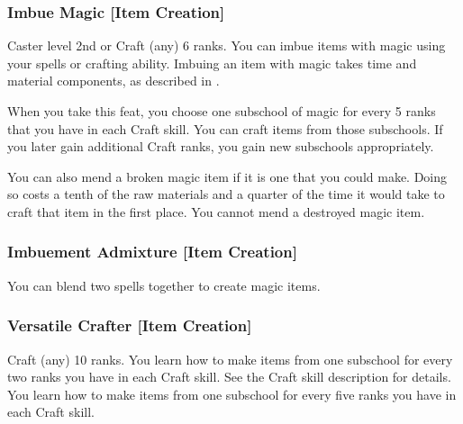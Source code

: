 \subsubsection{Imbue Magic [Item Creation]}
 Caster level 2nd or Craft (any) 6 ranks.
 You can imbue items with magic using your spells or crafting ability. Imbuing an item with magic takes time and material components, as described in .

When you take this feat, you choose one subschool of magic for every 5 ranks that you have in each Craft skill. You can craft items from those subschools. If you later gain additional Craft ranks, you gain new subschools appropriately.

You can also mend a broken magic item if it is one that you could make. Doing so costs a tenth of the raw materials and a quarter of the time it would take to craft that item in the first place. You cannot mend a destroyed magic item.

\subsubsection{Imbuement Admixture [Item Creation]}
 You can blend two spells together to create magic items. 

\subsubsection{Versatile Crafter [Item Creation]}
 Craft (any) 10 ranks.
 You learn how to make items from one subschool for every two ranks you have in each Craft skill. See the Craft skill description for details.
 You learn how to make items from one subschool for every five ranks you have in each Craft skill.
